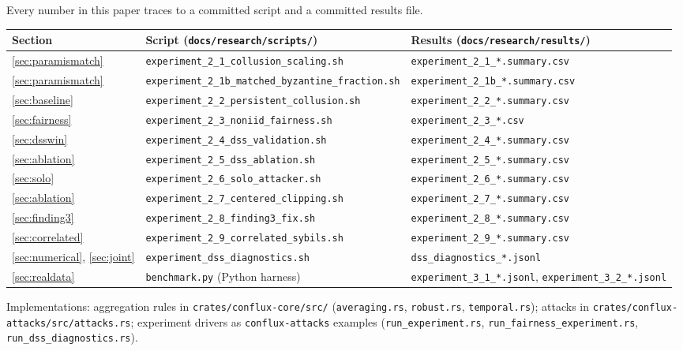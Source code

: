 \documentclass[11pt,a4paper]{article}
\newcommand{\code}[1]{\texttt{\small #1}}
\begin{document}
Every number in this paper traces to a committed script and a committed
results file.

\begin{table}[htbp]
\centering
\small
\begin{tabular}{lll}
\toprule
\textbf{Section} & \textbf{Script (\code{docs/research/scripts/})} & \textbf{Results (\code{docs/research/results/})} \\
\midrule
\ref{sec:paramismatch} & \code{experiment\_2\_1\_collusion\_scaling.sh} & \code{experiment\_2\_1\_*.summary.csv} \\
\ref{sec:paramismatch} & \code{experiment\_2\_1b\_matched\_byzantine\_fraction.sh} & \code{experiment\_2\_1b\_*.summary.csv} \\
\ref{sec:baseline} & \code{experiment\_2\_2\_persistent\_collusion.sh} & \code{experiment\_2\_2\_*.summary.csv} \\
\ref{sec:fairness} & \code{experiment\_2\_3\_noniid\_fairness.sh} & \code{experiment\_2\_3\_*.csv} \\
\ref{sec:dsswin} & \code{experiment\_2\_4\_dss\_validation.sh} & \code{experiment\_2\_4\_*.summary.csv} \\
\ref{sec:ablation} & \code{experiment\_2\_5\_dss\_ablation.sh} & \code{experiment\_2\_5\_*.summary.csv} \\
\ref{sec:solo} & \code{experiment\_2\_6\_solo\_attacker.sh} & \code{experiment\_2\_6\_*.summary.csv} \\
\ref{sec:ablation} & \code{experiment\_2\_7\_centered\_clipping.sh} & \code{experiment\_2\_7\_*.summary.csv} \\
\ref{sec:finding3} & \code{experiment\_2\_8\_finding3\_fix.sh} & \code{experiment\_2\_8\_*.summary.csv} \\
\ref{sec:correlated} & \code{experiment\_2\_9\_correlated\_sybils.sh} & \code{experiment\_2\_9\_*.summary.csv} \\
\ref{sec:numerical}, \ref{sec:joint} & \code{experiment\_dss\_diagnostics.sh} & \code{dss\_diagnostics\_*.jsonl} \\
\ref{sec:realdata} & \code{benchmark.py} (Python harness) & \code{experiment\_3\_1\_*.jsonl}, \code{experiment\_3\_2\_*.jsonl} \\
\bottomrule
\end{tabular}
\end{table}

Implementations: aggregation rules in \code{crates/conflux-core/src/}
(\code{averaging.rs}, \code{robust.rs}, \code{temporal.rs}); attacks in
\code{crates/conflux-attacks/src/attacks.rs}; experiment drivers as
\code{conflux-attacks} examples (\code{run\_experiment.rs},
\code{run\_fairness\_experiment.rs}, \code{run\_dss\_diagnostics.rs}).
\end{document}
